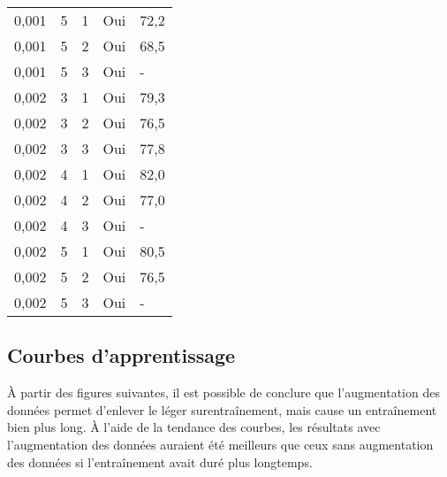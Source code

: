 \begin{longtable}{p{4cm}p{1cm}p{1cm}p{3.5cm}p{4cm}}
        0,001 & 5 & 1 & Oui & 72,2\\
        0,001 & 5 & 2 & Oui & 68,5\\
        0,001 & 5 & 3 & Oui & -\\
        
        0,002 & 3 & 1 & Oui & 79,3\\
        0,002 & 3 & 2 & Oui & 76,5\\
        0,002 & 3 & 3 & Oui & 77,8\\
        
        0,002 & 4 & 1 & Oui & 82,0\\
        0,002 & 4 & 2 & Oui & 77,0\\
        0,002 & 4 & 3 & Oui & -\\
        
        0,002 & 5 & 1 & Oui & 80,5\\
        0,002 & 5 & 2 & Oui & 76,5\\
        0,002 & 5 & 3 & Oui & -\\            
        \hline
    \end{longtable}

\subsection{Courbes d'apprentissage}
    À partir des figures suivantes, il est possible de conclure que l'augmentation des données permet d'enlever le léger surentraînement, mais cause un entraînement bien plus long. À l'aide de la tendance des courbes, les résultats avec l'augmentation des données auraient été meilleurs que ceux sans augmentation des données si l'entraînement avait duré plus longtemps.

    \begin{figure}[H]
        \centering 
        \caption{ }
    \end{figure}

    \begin{figure}[H]
        \centering 
        \caption{ }
    \end{figure}

    \begin{figure}[H]
        \centering 
        \caption{ }
    \end{figure}

    \begin{figure}[H]
        \centering 
        \caption{ }
    \end{figure}
    
